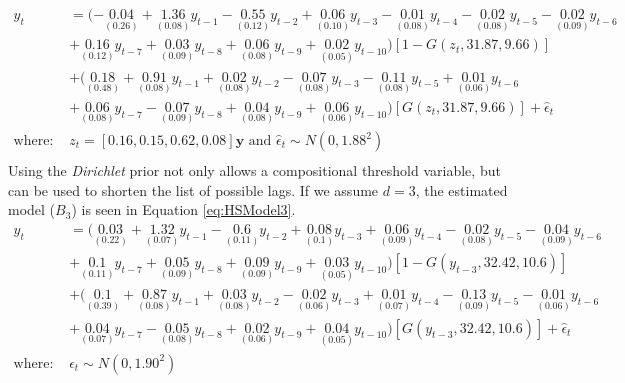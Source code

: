 \begin{equation}
\begin{split}
 	y_t &=(-\underset{(0.26)}{0.04}+\underset{(0.08)}{1.36}y_{t-1}-\underset{(0.12)}{0.55}y_{t-2}+\underset{(0.10)}{0.06}y_{t-3}-\underset{(0.08)}{0.01}y_{t-4}-\underset{(0.08)}{0.02}y_{t-5}-\underset{(0.09)}{0.02}y_{t-6}\\
 	&+\underset{(0.12)}{0.16}y_{t-7}+\underset{(0.09)}{0.03}y_{t-8}+\underset{(0.08)}{0.06}y_{t-9}+\underset{(0.05)}{0.02}y_{t-10})[1-G(z_t,31.87,9.66)]\\
 	&+(\underset{(0.48)}{0.18}+\underset{(0.08)}{0.91}y_{t-1}+\underset{(0.08)}{0.02}y_{t-2}-\underset{(0.08)}{0.07}y_{t-3}-\underset{(0.08)}{0.11}y_{t-5}+\underset{(0.06)}{0.01}y_{t-6}\\
 	&+\underset{(0.08)}{0.06}y_{t-7}-\underset{(0.09)}{0.07}y_{t-8}+\underset{(0.08)}{0.04}y_{t-9}+\underset{(0.06)}{0.06}y_{t-10})[G(z_t,31.87,9.66)]+\hat{\epsilon}_t\\
 	\textrm{where: } & z_t=[0.16,0.15,0.62,0.08]\bm{y} \textrm{ and } \hat{\epsilon}_t \sim N(0, 1.88^2)\\
\end{split}
\label{eq:HSModelDIR}
\end{equation}
Using the \textit{Dirichlet} prior not only allows a compositional threshold variable, but can be used to shorten the list of possible lags. If we assume $d=3$, the estimated model ($B_3$) is seen in Equation \ref{eq:HSModel3}.
\begin{equation}
\begin{split}
 	y_t &=(\underset{(0.22)}{0.03}+\underset{(0.07)}{1.32}y_{t-1}-\underset{(0.11)}{0.6}y_{t-2}+\underset{(0.1)}{0.08}y_{t-3}+\underset{(0.09)}{0.06}y_{t-4}-\underset{(0.08)}{0.02}y_{t-5}-\underset{(0.09)}{0.04}y_{t-6}\\
 	&+\underset{(0.11)}{0.1}y_{t-7}+\underset{(0.09)}{0.05}y_{t-8}+\underset{(0.09)}{0.09}y_{t-9}+\underset{(0.05)}{0.03}y_{t-10})[1-G(y_{t-3},32.42,10.6)]\\
 	&+(\underset{(0.39)}{0.1}+\underset{(0.08)}{0.87}y_{t-1}+\underset{(0.08)}{0.03}y_{t-2}-\underset{(0.06)}{0.02}y_{t-3}+\underset{(0.07)}{0.01}y_{t-4}-\underset{(0.09)}{0.13}y_{t-5}-\underset{(0.06)}{0.01}y_{t-6}\\
 	&+\underset{(0.07)}{0.04}y_{t-7}-\underset{(0.08)}{0.05}y_{t-8}+\underset{(0.06)}{0.02}y_{t-9}+\underset{(0.05)}{0.04}y_{t-10})[G(y_{t-3},32.42,10.6)]+\hat{\epsilon}_t\\
 	\textrm{where: } & \hat{\epsilon}_t \sim N(0, 1.90^2)\\
\end{split}
\label{eq:HSModel3}
\end{equation}
